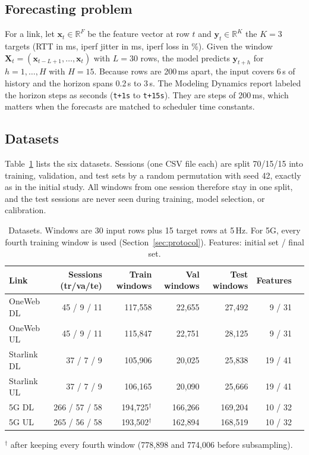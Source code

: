 \subsection{Forecasting problem}
For a link, let $\mathbf{x}_t\in\mathbb{R}^{F}$ be the feature vector at row $t$ and $\mathbf{y}_t\in\mathbb{R}^{K}$ the $K=3$ targets (RTT in ms, iperf jitter in ms, iperf loss in \%). Given the window $\mathbf{X}_t=(\mathbf{x}_{t-L+1},\dots,\mathbf{x}_t)$ with $L=30$ rows, the model predicts $\mathbf{y}_{t+h}$ for $h=1,\dots,H$ with $H=15$. Because rows are 200\,ms apart, the input covers 6\,s of history and the horizon spans 0.2\,s to 3\,s. The Modeling Dynamics report labeled the horizon steps as seconds (\texttt{t+1s} to \texttt{t+15s}). They are steps of 200\,ms, which matters when the forecasts are matched to scheduler time constants.

\subsection{Datasets}
Table~\ref{tab:data} lists the six datasets. Sessions (one CSV file each) are split 70/15/15 into training, validation, and test sets by a random permutation with seed 42, exactly as in the initial study. All windows from one session therefore stay in one split, and the test sessions are never seen during training, model selection, or calibration.

\begin{table}[t]
\centering
\caption{Datasets. Windows are 30 input rows plus 15 target rows at 5\,Hz. For 5G, every fourth training window is used (Section~\ref{sec:protocol}). Features: initial set / final set.}
\label{tab:data}
\small
\begin{tabular}{lrrrrrr}
\toprule
Link & Sessions (tr/va/te) & Train windows & Val windows & Test windows & Features \\
\midrule
OneWeb DL   & 45 / 9 / 11   & 117{,}558 & 22{,}655  & 27{,}492  & 9 / 31 \\
OneWeb UL   & 45 / 9 / 11   & 115{,}847 & 22{,}751  & 28{,}125  & 9 / 31 \\
Starlink DL & 37 / 7 / 9    & 105{,}906 & 20{,}025  & 25{,}838  & 19 / 41 \\
Starlink UL & 37 / 7 / 9    & 106{,}165 & 20{,}090  & 25{,}666  & 19 / 41 \\
5G DL       & 266 / 57 / 58 & 194{,}725$^\dagger$ & 166{,}266 & 169{,}204 & 10 / 32 \\
5G UL       & 265 / 56 / 58 & 193{,}502$^\dagger$ & 162{,}894 & 168{,}519 & 10 / 32 \\
\bottomrule
\end{tabular}

\smallskip
\footnotesize $^\dagger$ after keeping every fourth window (778{,}898 and 774{,}006 before subsampling).
\end{table}
